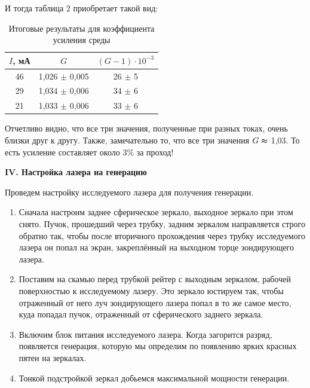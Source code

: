 \documentclass[a4paper,12pt]{article} %
\begin{document}
	И тогда таблица 2 приобретает такой вид:
	
	\begin{table}[h!]
		\centering
		\begin{tabular}{|c|c|c|}
			\hline
			$I$, мА & $G$               & $(G - 1) \cdot 10^{-3}$ \\ \hline
			46      & 1,026 $\pm$ 0,005 & 26 $\pm$ 5              \\ \hline
			29      & 1,034 $\pm$ 0,006 & 34 $\pm$ 6              \\ \hline
			21      & 1,033 $\pm$ 0,006 & 33 $\pm$ 6              \\ \hline
		\end{tabular}
	\caption{Итоговые результаты для коэффициента усиления среды}
	\end{table}

	Отчетливо видно, что все три значения, полученные при разных токах, очень близки друг к другу. Также, замечательно то, что все три значения $G \thickapprox$ 1,03. То есть усиление составляет около 3\% за проход! 

	\newpage
	\begin{center}
		\textbf{IV. Настройка лазера на генерацию}
	\end{center}

	Проведем настройку исследуемого лазера для получения генерации.
	\begin{enumerate}
		\item Сначала настроим заднее сферическое зеркало, выходное зеркало при этом снято. Пучок, прошедший через трубку, задним зеркалом направляется строго обратно так, чтобы после вторичного прохождения через трубку исследуемого лазера он попал на экран, закреплённый на выходном торце зондирующего лазера.
		
		\item Поставим на скамью перед трубкой рейтер с выходным зеркалом, рабочей поверхностью к исследуемому лазеру. Это зеркало юстируем так, чтобы отраженный от него луч зондирующего лазера попал в то же самое место, куда попадал пучок, отраженный от сферического заднего зеркала.
		
		\item Включим блок питания исследуемого лазера. Когда загорится разряд, появляется генерация, которую мы определим по появлению ярких красных пятен на зеркалах.
		
		\item Тонкой подстройкой зеркал добьемся максимальной мощности генерации.
	\end{enumerate}  
\end{document}
